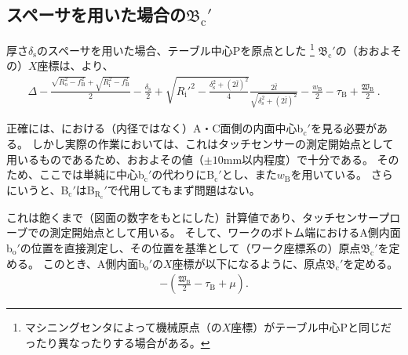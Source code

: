 \subsection[スペーサを用いた場合の\texorpdfstring{$\mathfrak B_\mathrm c'$}{Bc'}]
           {スペーサを用いた場合の$\boldsymbol{\mathfrak B_\mathrm c'}$}
厚さ$\delta_\mathrm s$のスペーサを用いた場合、テーブル中心Pを原点とした
\footnote{マシニングセンタによって機械原点（の$X$座標）がテーブル中心Pと同じだったり異なったりする場合がある。}\relax
\BottomOutcutCenter$\mathfrak B_\mathrm c'$の（おおよその）$X$座標は、より、
\begin{align*}
  \Delta-\frac{\sqrt{R_\mathrm o^2-f_\mathrm B^2}+\sqrt{R_\mathrm i^2-f_\mathrm B^2}}2-\frac{\delta_\mathrm s}2
  +\sqrt{R_\mathrm i'^2-\frac{\delta_\mathrm s^2+(2\bar l)^2}4}\frac{2\bar l}{\sqrt{\delta_\mathrm s^2+(2\bar l)^2}}
  -\frac{w_\mathrm B}2-\tau_\mathrm B+\frac{\mathfrak W_\mathrm B}2\ .
\end{align*}
\begin{hosoku}
正確には、\nameBottomEndFace における（内径ではなく）A・C面側の内面中心b$_\mathrm c'$を見る必要がある。
しかし実際の作業においては、これはタッチセンサーの測定開始点として用いるものであるため、おおよその値（$\pm10$mm以内程度）で十分である。
そのため、ここでは単純に中心b$_\mathrm c'$の代わりに\BottomODCenter B$_\mathrm c'$とし、また\BottomEndACID$w_\mathrm B$を用いている。
さらにいうと、\BottomODCenter B$_\mathrm c'$は\BottomCurvatureCenter B$_{\mathrm R_\mathrm c}'$で代用してもまず問題はない。
\end{hosoku}
これは飽くまで（図面の数字をもとにした）計算値であり、タッチセンサープローブでの測定開始点として用いる。
そして、ワークのボトム端におけるA側内面b$_\mathrm o'$の位置を直接測定し、その位置を基準として（ワーク座標系の）原点$\mathfrak B_\mathrm c'$を定める。
このとき、A側内面b$_\mathrm o'$の$X$座標が以下になるように、原点$\mathfrak B_\mathrm c'$を定める。
\begin{align*}
  -\left(\frac{\mathfrak W_\mathrm B}2-\tau_\mathrm B+\mu\right).
\end{align*}

